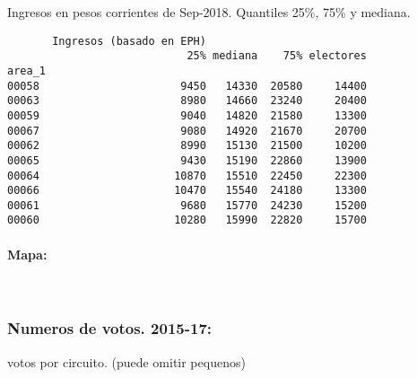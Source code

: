 \documentclass[11pt]{article}
\begin{document}
    
    Ingresos en pesos corrientes de Sep-2018. Quantiles 25\%, 75\% y
mediana.

    
    
    \begin{verbatim}
       Ingresos (basado en EPH)                         
                            25% mediana    75% electores
area_1                                                  
00058                      9450   14330  20580     14400
00063                      8980   14660  23240     20400
00059                      9040   14820  21580     13300
00067                      9080   14920  21670     20700
00062                      8990   15130  21500     10200
00065                      9430   15190  22860     13900
00064                     10870   15510  22450     22300
00066                     10470   15540  24180     13300
00061                      9680   15770  24230     15200
00060                     10280   15990  22820     15700
    \end{verbatim}

    
    \hypertarget{mapa}{%
\paragraph{Mapa:}\label{mapa}}

    
    \begin{center}
    \end{center}
    { \hspace*{\fill} \\}
    
    \hypertarget{numeros-de-votos.-2015-17}{%
\subsubsection{Numeros de votos.
2015-17:}\label{numeros-de-votos.-2015-17}}

    
    votos por circuito. (puede omitir pequenos)

    
    
\end{document}
